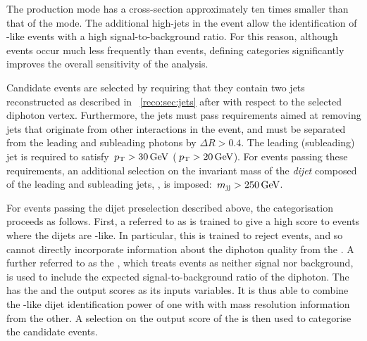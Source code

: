 The \VBF production mode has a cross-section approximately ten times smaller than that of the \ggH mode. The additional high-\pT jets in the event allow the identification of \VBF-like events with a high signal-to-background ratio. For this reason, although \VBF events occur much less frequently than \ggH events, defining \VBFTag categories significantly improves the overall sensitivity of the analysis.

Candidate \VBF events are selected by requiring that they contain two jets reconstructed as described in \Sec~\ref{reco:sec:jets} after \PFCHS with respect to the selected diphoton vertex. Furthermore, the jets must pass requirements aimed at removing jets that originate from other \pp interactions in the event, and must be separated from the leading and subleading photons by $\Delta R > 0.4$. The leading (subleading) jet is required to satisfy $\,p_\text{T} > 30 \,\text{Ge\hspace{-.08em}V}$ ($\,p_\text{T} > 20 \,\text{Ge\hspace{-.08em}V}$). For events passing these requirements, an additional selection on the invariant mass of the \emph{dijet} composed of the leading and subleading jets, \mjj, is imposed: $\,m_\text{jj} > 250\,\text{Ge\hspace{-.08em}V}$. %

For events passing the dijet preselection described above, the \VBFTag categorisation proceeds as follows. First, a \BDT referred to as \DiJetBdt is trained to give a high score to events where the dijets are \VBF-like. In particular, this is trained to reject \ggH events, and so cannot directly incorporate information about the diphoton quality from the \DiPhoBdt. %
A further \BDT referred to as the \DiPhoDiJetBdt, which treats \ggH events as neither signal nor background, is used to include the expected signal-to-background ratio of the diphoton. The \DiPhoDiJetBdt has the \DiPhoBdt and the \DiJetBdt output scores as its inputs variables. It is thus able to combine the \VBF-like dijet identification power of one \BDT with with mass resolution information from the other. %
A selection on the output score of the \DiPhoDiJetBdt is then used to categorise the candidate \VBFTag events.

